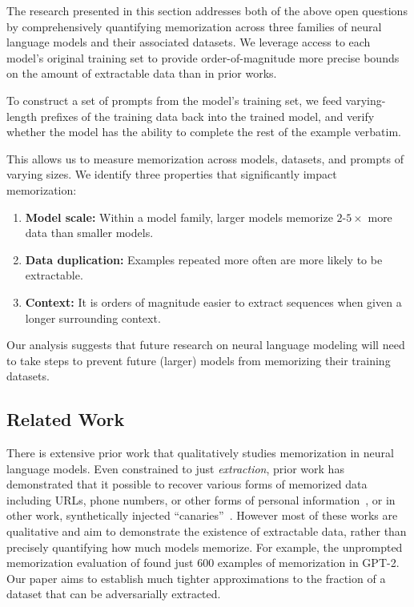 The research presented in this section addresses both of the above open questions by 
comprehensively quantifying memorization across three families of neural language models and their associated datasets.
%
We leverage access to each model's original training set to provide order-of-magnitude more precise bounds on the amount of extractable data than in prior works.

To construct a set of prompts from the model's training set, 
we feed varying-length prefixes of the training data back into the trained model, and verify whether the model has the ability to complete the rest of the example verbatim.

%
This allows us to measure memorization across models, datasets, and prompts of varying sizes. We identify three properties that significantly impact memorization:

\begin{enumerate}
    \item \textbf{Model scale:} %
    Within a model family, larger models memorize $2$-$5\times$ more data than smaller models. 

    \item \textbf{Data duplication:} Examples repeated more often are more likely to be extractable.
    
    \item \textbf{Context:} It is orders of magnitude easier to extract sequences when given a longer surrounding context.
\end{enumerate}

Our analysis suggests that future research on neural language modeling will need to take steps
to prevent future (larger) models from memorizing their training datasets.


\subsection{Related Work}

There is extensive prior work that qualitatively studies memorization in neural language models. Even constrained to just \emph{extraction}, prior work has demonstrated that it possible to recover various forms of memorized data including URLs, phone numbers, or other forms of personal information~\citep{carlini2020extracting, ziegler2021copilot}, or in other work, synthetically injected ``canaries''~\citep{carlini2019secret, henderson2017ethical, thakkar2020understanding, thomas2020investigating}.
%
However most of these works are qualitative and aim to demonstrate the existence of extractable data, rather than precisely quantifying how much models memorize.
For example, the unprompted memorization evaluation of \citet{carlini2020extracting} found just 600 examples of memorization in GPT-2.
%
Our paper aims to establish much tighter approximations to the fraction of a dataset that can be adversarially extracted.

